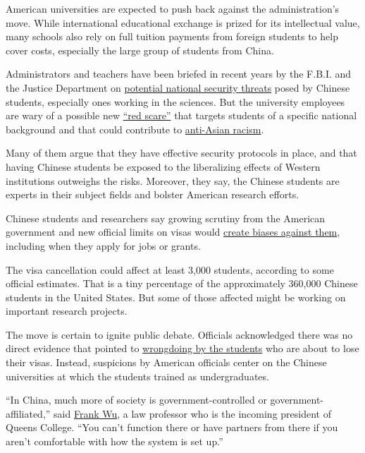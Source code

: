 American universities are expected to push back against the
administration's move. While international educational exchange is
prized for its intellectual value, many schools also rely on full
tuition payments from foreign students to help cover costs, especially
the large group of students from China.

Administrators and teachers have been briefed in recent years by the
F.B.I. and the Justice Department on
\href{https://www.nytimes3xbfgragh.onion/2019/11/04/health/china-nih-scientists.html}{potential
national security threats} posed by Chinese students, especially ones
working in the sciences. But the university employees are wary of a
possible new
\href{https://www.nytimes3xbfgragh.onion/2019/07/20/us/politics/china-red-scare-washington.html}{``red
scare''} that targets students of a specific national background and
that could contribute to
\href{https://www.nytimes3xbfgragh.onion/2020/03/23/us/chinese-coronavirus-racist-attacks.html}{anti-Asian
racism}.

Many of them argue that they have effective security protocols in place,
and that having Chinese students be exposed to the liberalizing effects
of Western institutions outweighs the risks. Moreover, they say, the
Chinese students are experts in their subject fields and bolster
American research efforts.

Chinese students and researchers say growing scrutiny from the American
government and new official limits on visas would
\href{https://www.nytimes3xbfgragh.onion/2018/07/25/us/politics/visa-restrictions-chinese-students.html}{create
biases against them}, including when they apply for jobs or grants.

The visa cancellation could affect at least 3,000 students, according to
some official estimates. That is a tiny percentage of the approximately
360,000 Chinese students in the United States. But some of those
affected might be working on important research projects.

The move is certain to ignite public debate. Officials acknowledged
there was no direct evidence that pointed to
\href{https://theintercept.com/2020/02/02/fbi-chinese-scientists-surveillance/}{wrongdoing
by the students} who are about to lose their visas. Instead, suspicions
by American officials center on the Chinese universities at which the
students trained as undergraduates.

``In China, much more of society is government-controlled or
government-affiliated,'' said
\href{https://queenseagle.com/all/queens-college-new-president-frank-wu}{Frank
Wu}, a law professor who is the incoming president of Queens College.
``You can't function there or have partners from there if you aren't
comfortable with how the system is set up.''

